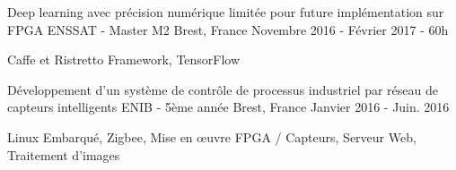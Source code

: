 

\begin{cventries}

\cventry
{Deep learning avec précision numérique limitée pour future implémentation sur FPGA } %
{ENSSAT - Master M2} %
{Brest, France} %
{Novembre 2016 - Février 2017 - 60h} %
{
	\begin{cvitems} %
		\item {Caffe et Ristretto Framework, TensorFlow}
	\end{cvitems}
}

\cventry
{Développement d’un système de contrôle de processus industriel par réseau de capteurs intelligents} %
{ENIB - 5ème année} %
{Brest, France} %
{Janvier 2016 - Juin. 2016 } %
{
	\begin{cvitems} %
		\item {Linux Embarqué, Zigbee, Mise en \oe{}uvre FPGA / Capteurs, Serveur Web, Traitement d’images }
	\end{cvitems}
}





\end{cventries}
